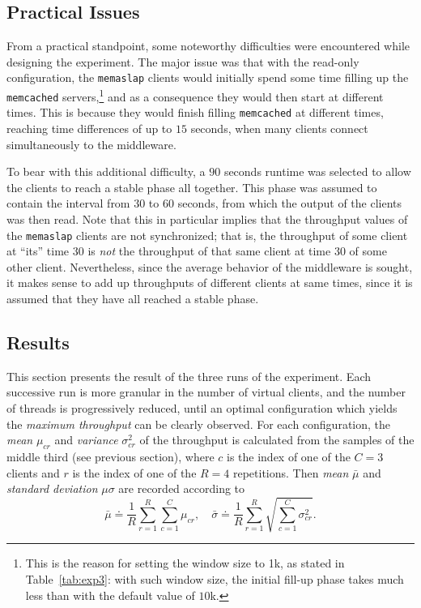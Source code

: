 \documentclass[11pt]{article}
\theoremstyle{definition}
\renewcommand\t\texttt
\begin{document}
\subsection{Practical Issues}

From a practical standpoint, some noteworthy difficulties were encountered while designing the experiment.
The major issue was that with the read-only configuration, the \t{memaslap} clients would initially spend some time filling up the \t{memcached} servers,\footnote{This is the reason for setting the window size to 1k, as stated in Table~\ref{tab:exp3}: with such window size, the initial fill-up phase takes much less than with the default value of $10$k.} and as a consequence they would then start at different times.
This is because they would finish filling \t{memcached} at different times, reaching time differences of up to $15$ seconds, when many clients connect simultaneously to the middleware.

To bear with this additional difficulty, a $90$ seconds runtime was selected to allow the clients to reach a stable phase all together.
This phase was assumed to contain the interval from $30$ to $60$ seconds, from which the output of the clients was then read.
Note that this in particular implies that the throughput values of the \t{memaslap} clients are not synchronized; that is, the throughput of some client at ``its'' time $30$ is \emph{not} the throughput of that same client at time $30$ of some other client.
Nevertheless, since the average behavior of the middleware is sought, it makes sense to add up throughputs of different clients at same times, since it is assumed that they have all reached a stable phase.


\subsection{Results}

This section presents the result of the three runs of the experiment.
Each successive run is more granular in the number of virtual clients, and the number of threads is progressively reduced, until an optimal configuration which yields the \emph{maximum throughput} can be clearly observed.
For each configuration, the \emph{mean} $\mu_{cr}$ and \emph{variance} $\sigma^2_{cr}$ of the throughput is calculated from the samples of the middle third (see previous section), where $c$ is the index of one of the $C=3$ clients and $r$ is the index of one of the $R=4$ repetitions.
Then \emph{mean} $\bar\mu$ and \emph{standard deviation} $\mu\sigma$ are recorded according to
\begin{equation}
    \label{eqn:avgstd}
    \bar\mu\doteq\frac1R\sum_{r=1}^R\sum_{c=1}^C\mu_{cr},\quad\bar\sigma\doteq\frac1R\sum_{r=1}^R\sqrt{\sum_{c=1}^C\sigma^2_{cr}}.
\end{equation}
\end{document}

